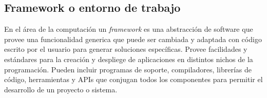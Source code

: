 \subsection{Framework o entorno de trabajo} 

En el área de la computación un \emph{framework} es una abstracción de software que provee una funcionalidad generica que puede ser cambiada y adaptada con código escrito por el usuario para generar soluciones específicas. Provee facilidades y estándares para la creación y despliege de aplicaciones en distintos nichos de la programación. Pueden incluir programas de soporte, compiladores, librerías de código, herramientas y APIs que conjugan todos los componentes para permitir el desarrollo de un proyecto o sistema.


